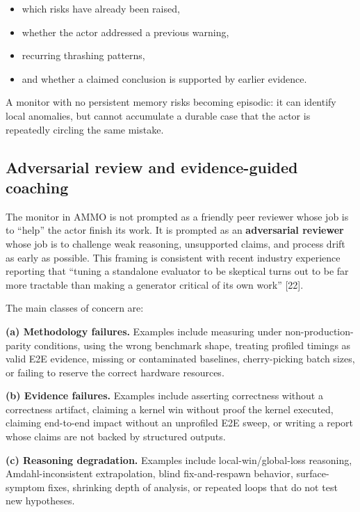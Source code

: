 \documentclass[11pt]{article}
\begin{document}
\begin{itemize}[leftmargin=*,itemsep=2pt]
  \item which risks have already been raised,
  \item whether the actor addressed a previous warning,
  \item recurring thrashing patterns,
  \item and whether a claimed conclusion is supported by earlier evidence.
\end{itemize}

A monitor with no persistent memory risks becoming episodic: it can identify local anomalies, but cannot accumulate a durable case that the actor is repeatedly circling the same mistake.

\subsection{Adversarial review and evidence-guided coaching}

The monitor in AMMO is not prompted as a friendly peer reviewer whose job is to ``help'' the actor finish its work. It is prompted as an \textbf{adversarial reviewer} whose job is to challenge weak reasoning, unsupported claims, and process drift as early as possible. This framing is consistent with recent industry experience reporting that ``tuning a standalone evaluator to be skeptical turns out to be far more tractable than making a generator critical of its own work'' [22].

The main classes of concern are:

\textbf{(a) Methodology failures.}
Examples include measuring under non-production-parity conditions, using the wrong benchmark shape, treating profiled timings as valid E2E evidence, missing or contaminated baselines, cherry-picking batch sizes, or failing to reserve the correct hardware resources.

\textbf{(b) Evidence failures.}
Examples include asserting correctness without a correctness artifact, claiming a kernel win without proof the kernel executed, claiming end-to-end impact without an unprofiled E2E sweep, or writing a report whose claims are not backed by structured outputs.

\textbf{(c) Reasoning degradation.}
Examples include local-win/global-loss reasoning, Amdahl-inconsistent extrapolation, blind fix-and-respawn behavior, surface-symptom fixes, shrinking depth of analysis, or repeated loops that do not test new hypotheses.
\end{document}
